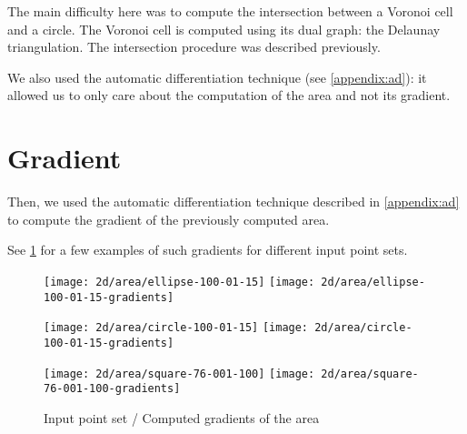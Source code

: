 The main difficulty here was to compute the intersection between a Voronoi cell
and a circle. The Voronoi cell is computed using its dual graph: the Delaunay
triangulation. The intersection procedure was described previously.

We also used the automatic differentiation technique (see \ref{appendix:ad}): it
allowed us to only care about the computation of the area and not its gradient.

\section{Gradient}

Then, we used the automatic differentiation technique described in
\ref{appendix:ad} to compute the gradient of the previously computed area.

See \ref{fig:gradients_area_2d} for a few examples of such gradients for different input point sets.

\begin{figure}[h]
    \centering

    \begin{minipage}{0.8\linewidth}
        \centering
        \texttt{[image: 2d/area/ellipse-100-01-15]}
        \texttt{[image: 2d/area/ellipse-100-01-15-gradients]}
        \label{fig:gradients_area_2d_ellipse}
    \end{minipage}

    \begin{minipage}{0.8\linewidth}
        \centering
        \texttt{[image: 2d/area/circle-100-01-15]}
        \texttt{[image: 2d/area/circle-100-01-15-gradients]}
        \label{fig:gradients_area_2d_circle}
    \end{minipage}

    \begin{minipage}{0.8\linewidth}
        \centering
        \texttt{[image: 2d/area/square-76-001-100]}
        \texttt{[image: 2d/area/square-76-001-100-gradients]}
        \label{fig:gradients_area_2d_square}
    \end{minipage}

    \caption{Input point set / Computed gradients of the area}
    \label{fig:gradients_area_2d}
\end{figure}


